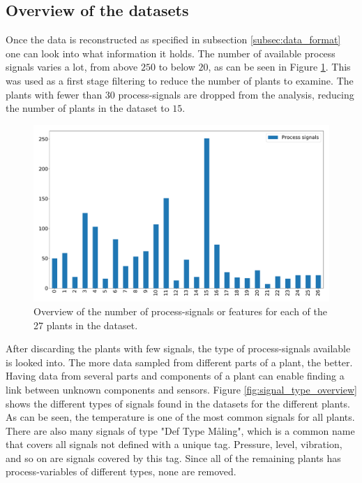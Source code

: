         
    \subsection{Overview of the datasets}
        Once the data is reconstructed as specified in subsection \ref{subsec:data_format} one can look into what information it holds. The number of available process signals varies a lot, from above $250$ to below $20$, as can be seen in Figure \ref{fig:process_signal_overview}. This was used as a first stage filtering to reduce the number of plants to examine. The plants with fewer than $30$ process-signals are dropped from the analysis, reducing the number of plants in the dataset to $15$.    
        
        \begin{figure}[h]
            \centering
            \includegraphics[width=\textwidth]{report/figures/data/plant_process_signals_overview.pdf}
            \caption{Overview of the number of process-signals or features for each of the 27 plants in the dataset.}
            \label{fig:process_signal_overview}
        \end{figure}
        
        After discarding the plants with few signals, the type of process-signals available is looked into. The more data sampled from different parts of a plant, the better. Having data from several parts and components of a plant can enable finding a link between unknown components and sensors. Figure \ref{fig:signal_type_overview} shows the different types of signals found in the datasets for the different plants. As can be seen, the temperature is one of the most common signals for all plants. There are also many signals of type "Def Type Måling", which is a common name that covers all signals not defined with a unique tag. Pressure, level, vibration, and so on are signals covered by this tag. Since all of the remaining plants has process-variables of different types, none are removed. 
        
